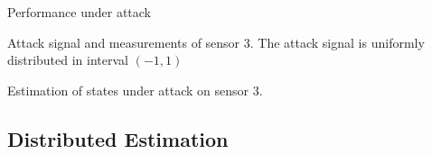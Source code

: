 \documentclass[10pt]{beamer}
\DeclareMathOperator{\1}{\textbf{1}}
\begin{document}
\begin{frame}{Performance under attack}
	\vspace{-30pt}
	\begin{figure}[ht]
		\centering
		\scalebox{0.65}{}
	\end{figure}
\vspace{-10pt}
	\small Attack signal and measurements of sensor 3. The attack signal is uniformly distributed in interval $(-1,1)$
	\vspace{-10pt}
	\begin{figure}[ht]
		\centering
		\scalebox{0.65}{}
	\end{figure}
\vspace{-10pt}
	Estimation of states under attack on sensor 3.
\end{frame}


\subsection{Distributed Estimation}

\frame{\tableofcontents[currentsection]}
%
\end{document}
